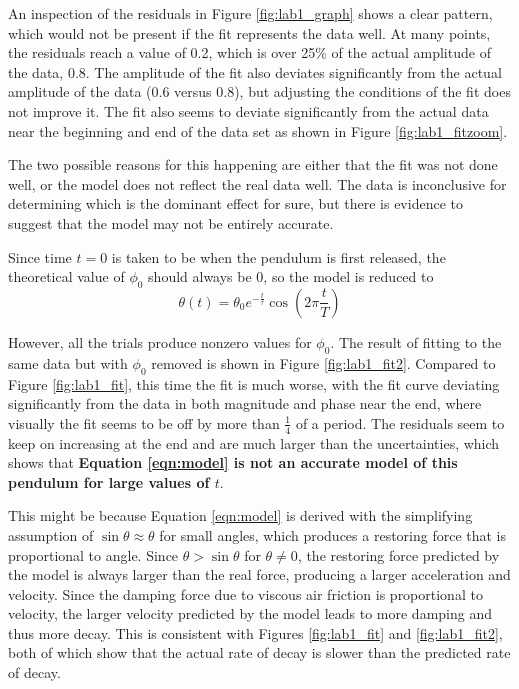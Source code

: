 \documentclass[aps,twocolumn,secnumarabic,nobalancelastpage,amsmath,amssymb,nofootinbib,floatfix,letterpaper]{revtex4}
\begin{document}
An inspection of the residuals in Figure \ref{fig:lab1_graph} shows a clear pattern, which would not be present if the fit
represents the data well. At many points, the residuals reach a value of 0.2, which is over 25\% of the actual
amplitude of the data, 0.8. The amplitude of the fit also deviates significantly from the actual amplitude of the data
(0.6 versus 0.8), but adjusting the conditions of the fit does not improve it. The fit also seems to deviate
significantly from the actual data near the beginning and end of the data set as shown in Figure \ref{fig:lab1_fitzoom}.

The two possible reasons for this happening are either that the fit was not done well, or the model does not reflect the
real data well. The data is inconclusive for determining which is the dominant effect for sure, but there is evidence to
suggest that the model may not be entirely accurate.

Since time \(t = 0\) is taken to be when the pendulum is first released, the theoretical value of \(\phi_0\) should
always be 0, so the model is reduced to
\begin{equation}
    \theta(t) = \theta_0 e^{-\frac{t}{\tau}}\cos\left(2\pi\frac{t}{T}\right)
    \label{eqn:model_nophi}
\end{equation}

However, all the trials produce nonzero values for \(\phi_0\). The result of fitting to the same data but with
\(\phi_0\) removed is shown in Figure \ref{fig:lab1_fit2}. Compared to Figure \ref{fig:lab1_fit}, this time the fit is
much worse, with the fit curve deviating significantly from the data in both magnitude and phase near the end, where
visually the fit seems to be off by more than \(\frac{1}{4}\) of a period. The residuals seem to keep on increasing at
the end and are much larger than the uncertainties, which shows that \textbf{Equation \ref{eqn:model} is not an
accurate model of this pendulum for large values of \(t\)}.

This might be because Equation \ref{eqn:model} is derived with the simplifying assumption of \(\sin \theta \approx \theta\)
for small angles, which produces a restoring force that is proportional to angle. Since \(\theta > \sin \theta\) for
\(\theta \neq 0\), the restoring force predicted by the model is always larger than the real force, producing a larger
acceleration and velocity. Since the damping force due to viscous air friction is proportional to velocity, the larger
velocity predicted by the model leads to more damping and thus more decay. This is consistent with Figures
\ref{fig:lab1_fit} and \ref{fig:lab1_fit2}, both of which show that the actual rate of decay is slower than the
predicted rate of decay.
\end{document}
